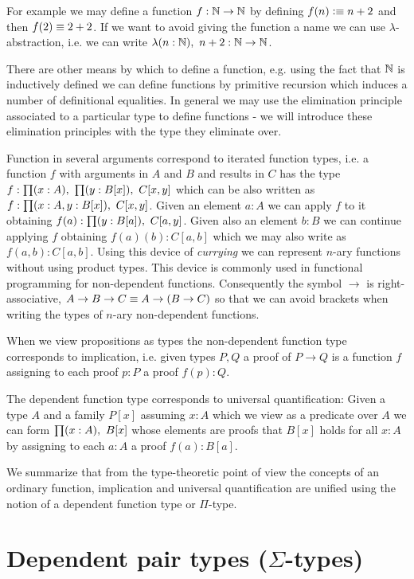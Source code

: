 {For example we may define a function $f : \mathbb{N} \to \mathbb{N}$ by defining $f(n)
\vcentcolon\equiv n+2$ and then $f(2) \equiv 2+2$. If we want to avoid giving the function a name we can use
$\lambda$-abstraction, i.e. we can write $\lam{n:\Nat}n+2 : \Nat
\to \Nat$. 

There are other means by which to define a function,
e.g. using the fact that $\mathbb{N}$ is inductively defined we can define
functions by primitive recursion which induces a number of
definitional equalities. In general we may use the
elimination principle associated to a particular type to define
functions - we will introduce these elimination principles with the
type they eliminate over.

Function in several arguments correspond to iterated function types,
i.e. a function $f$ with arguments in $A$ and $B$ and results in $C$ has
the type $f : \prd{x:A}\prd{y : B[x]}C[x,y]$ which can be also
written as $f : \prd{x:A,y:B[x]}C[x,y]$. Given an element $a:A$ we can apply
$f$ to it obtaining $f(a) : \prd{y:B[a]}C[a,y]$. Given also an element $b:B$ we
can continue applying $f$ obtaining $f(a)(b) : C[a,b]$ which we may also
write as $f(a,b):C[a,b]$. Using this device of \emph{currying} we can
represent $n$-ary functions without using product types. 
This device is commonly used in functional programming for
non-dependent functions. Consequently the symbol $\to$ is
right-associative,  $A \to B \to C \equiv A \to (B \to C)$ so that we can avoid
brackets when writing the types of $n$-ary non-dependent functions.

When we view propositions as types the non-dependent function type
corresponds to implication, i.e. given types $P,Q$ a proof of $P \to
Q$ is a function $f$ assigning to each proof $p:P$ a proof $f(p) : Q$.

The dependent function type corresponds to universal
quantification: Given a type $A$ and a family $P[x]$ assuming $x:A$
which we view as a predicate over $A$ we can form $\prd{x:A}B[x]$
whose elements are proofs that $B[x]$ holds for all $x:A$ by assigning
to each $a:A$ a proof $f(a) : B[a]$.

We summarize that from the type-theoretic point of view the concepts
of an ordinary function, implication and universal quantification are
unified using the notion of a dependent function type or $\Pi$-type.

\section{Dependent pair types (\texorpdfstring{$\Sigma$}{Σ}-types)}
\label{sec:sigma-types}

}
